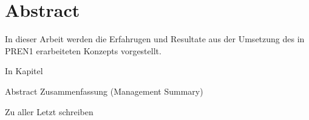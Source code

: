 \section*{Abstract}

In dieser Arbeit werden die Erfahrugen und Resultate aus der Umsetzung des in PREN1 erarbeiteten Konzepts vorgestellt. 

In Kapitel

Abstract
Zusammenfassung (Management Summary)

Zu aller Letzt schreiben